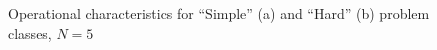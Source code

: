 \documentclass[preprint]{elsarticle}
\begin{document}
\begin{figure}[h!]
	\begin{minipage}[h]{0.48\linewidth}
	\end{minipage}
	\hfill
	\begin{minipage}[h]{0.48\linewidth}
	\end{minipage}
	\caption{Operational characteristics for “Simple” (a) and “Hard” (b) problem classes, $N = 5$}
	\label{fig:operational_characteristics_N=5}
\end{figure}
\end{document}
